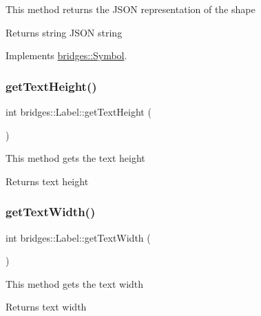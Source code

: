 This method returns the J\+S\+ON representation of the shape

\begin{DoxyReturn}{Returns}
string J\+S\+ON string 
\end{DoxyReturn}


Implements \mbox{\hyperlink{classbridges_1_1_symbol_ab4dd31fbc736b2e58e8b8bb8446eac73}{bridges\+::\+Symbol}}.

\mbox{\label{classbridges_1_1_label_a65746c9728f3b4e0c4b5c4d9ab0d4ee1}} 
\subsubsection{\texorpdfstring{get\+Text\+Height()}{getTextHeight()}}
{\footnotesize\ttfamily int bridges\+::\+Label\+::get\+Text\+Height (\begin{DoxyParamCaption}{ }\end{DoxyParamCaption})\hspace{0.3cm}{\ttfamily [inline]}}

This method gets the text height

\begin{DoxyReturn}{Returns}
text height 
\end{DoxyReturn}
\mbox{\label{classbridges_1_1_label_ae5259108e1d7c9aa63475a356e9759b7}} 
\subsubsection{\texorpdfstring{get\+Text\+Width()}{getTextWidth()}}
{\footnotesize\ttfamily int bridges\+::\+Label\+::get\+Text\+Width (\begin{DoxyParamCaption}{ }\end{DoxyParamCaption})\hspace{0.3cm}{\ttfamily [inline]}}

This method gets the text width

\begin{DoxyReturn}{Returns}
text width 
\end{DoxyReturn}
\mbox{\label{classbridges_1_1_label_aee9777172a46b4b2e099a4d1e317b6c1}} 

